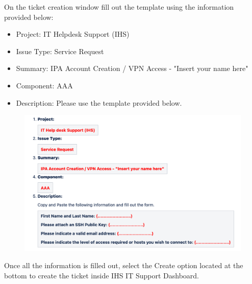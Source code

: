 On the ticket creation window fill out the template using the information provided below:

\begin{itemize}
  \item Project: IT Helpdesk Support (IHS)
  \item Issue Type: Service Request
  \item Summary: IPA Account Creation / VPN Access - "Insert your name here"
  \item Component: AAA
  \item Description: Please use the template provided below.
\end{itemize}

\vspace{10 mm}

\begin{figure}
  \includegraphics[width=15cm]{Images/example4.png}
\end{figure}

\newpage

Once all the information is filled out, select the Create option located at the bottom to create the ticket inside IHS IT Support Dashboard.

\vspace{10 mm}

